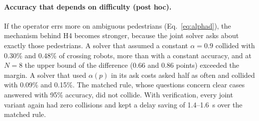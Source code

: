 \documentclass[a4paper,fleqn]{cas-dc}
\begin{document}
\paragraph{Accuracy that depends on difficulty (post hoc).} If the operator errs more on ambiguous pedestrians (Eq.~\eqref{eq:alphad}), the mechanism behind H4 becomes stronger, because the joint solver asks about exactly those pedestrians. A solver that assumed a constant $\alpha = 0.9$ collided with 0.30\% and 0.48\% of crossing robots, more than with a constant accuracy, and at $N = 8$ the upper bound of the difference (0.66 and 0.86 points) exceeded the margin. A solver that used $\alpha(p)$ in its ask costs asked half as often and collided with 0.09\% and 0.15\%. The matched rule, whose questions concern clear cases answered with 95\% accuracy, did not collide. With verification, every joint variant again had zero collisions and kept a delay saving of 1.4--\SI{1.6}{s} over the matched rule.
\end{document}
